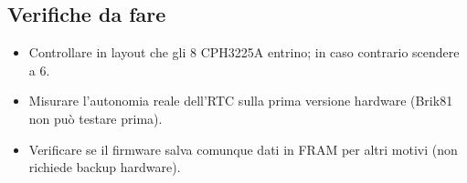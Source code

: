 \subsection{Verifiche da fare}
\begin{itemize}
  \item Controllare in layout che gli 8 CPH3225A entrino; in caso contrario scendere a 6.
  \item Misurare l'autonomia reale dell'RTC sulla prima versione hardware (Brik81 non può testare prima).
  \item Verificare se il firmware salva comunque dati in FRAM per altri motivi (non richiede backup hardware).
\end{itemize}
